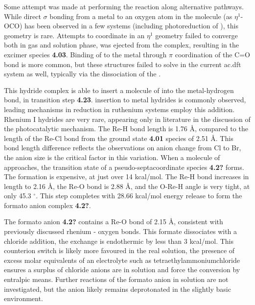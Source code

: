Some attempt was made at performing the reaction along alternative pathways. While direct $\sigma$ bonding from a metal to an oxygen atom in the  molecule (as $\eta^1$-OCO) has been observed in a few systems (including photoreduction of )\autocite{lee2001, mauser2001, souter1997}, this geometry is rare\autocite{castrorodriguez2004, cokoja2011, gibson1996}. Attempts to coordinate  in an $\eta^1$ geometry failed to converge both in gas and solution phase,  was ejected from the complex, resulting in the excimer species \textbf{4.03}. Binding of  to the metal through $\pi$ coordination of the C=O bond is more common\autocite{cokoja2011, gibson1996}, but these structures failed to solve in the current \gls{ac.dft} system as well, typically via the dissociation of the .

This hydride complex is able to insert a molecule of  into the metal-hydrogen bond, in transition step \textbf{4.23}.  insertion to metal hydrides is commonly observed, leading mechanisms in  reduction in ruthenium systems employ this addition\autocite{creutz2007}. Rhenium I hydrides are very rare, appearing only in literature in the discussion of the photocatalytic mechanism. The Re-H bond length is 1.76 \r{A}, compared to the length of the Re-Cl bond from the ground state \textbf{4.01} species of 2.51 \r{A}. This bond length difference reflects the observations on anion change from Cl to Br, the anion size is the critical factor in this variation. When a molecule of  approaches, the transition state of a pseudo-septacoordinate species \textbf{4.2?} forms. The formation is expensive, at just over 14 kcal/mol. The Re-H bond increases in length to 2.16 \r{A}, the Re-O bond is 2.88 \r{A}, and the O-Re-H angle is very tight, at only 45.3 $^\circ$. This step completes with 28.66 kcal/mol energy release to form the formato anion complex \textbf{4.2?}. 

The formato anion \textbf{4.2?} contains a Re-O bond of 2.15 \r{A}, consistent with previously discussed rhenium - oxygen bonds. This formate dissociates with a chloride addition, the exchange is endothermic by less than 3 kcal/mol. This counterion switch is likely more favoured in the real solution, the presence of excess molar equivalents of an electrolyte such as tetraethylammoniumchloride ensures a surplus of chloride anions are in solution and force the conversion by entralpic means. Further reactions of the formato anion in solution are not investigated, but the anion likely remains deprotonated in the slightly basic environment. 

